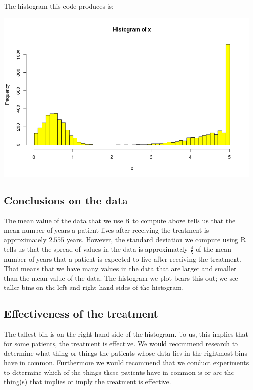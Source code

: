 \documentclass[a4paper,11pt]{article}
\begin{document}
The histogram this code produces is:

\begin{center}
\includegraphics[scale=0.5]{histogram-prob2}
\end{center}

\subsection{Conclusions on the data}
The mean value of the data that we use R to compute above tells us that
the mean number of years a patient lives after receiving the treatment is
approximately $2.555$ years.  However, the standard deviation we compute
using R tells us that the spread of values in the data is approximately
$\frac{4}{5}$ of the mean number of years that a patient is expected to live
after receiving the treatment.  That means that we have many values in the
data that are larger and smaller than the mean value of the data. The histogram
we plot bears this out; we see taller bins on the left and
right hand sides of the histogram.

\subsection{Effectiveness of the treatment}
The tallest bin is on the right hand side of the histogram.  To us, this implies
that for some patients, the treatment is effective.  We would recommend
research to determine what thing or things the patients whose data lies in
the rightmost bins have in common.  Furthermore we would recommend that we
conduct experiments to determine which of the things these patients have in
common is or are the thing(s) that implies or imply the treatment is effective.
\end{document}
